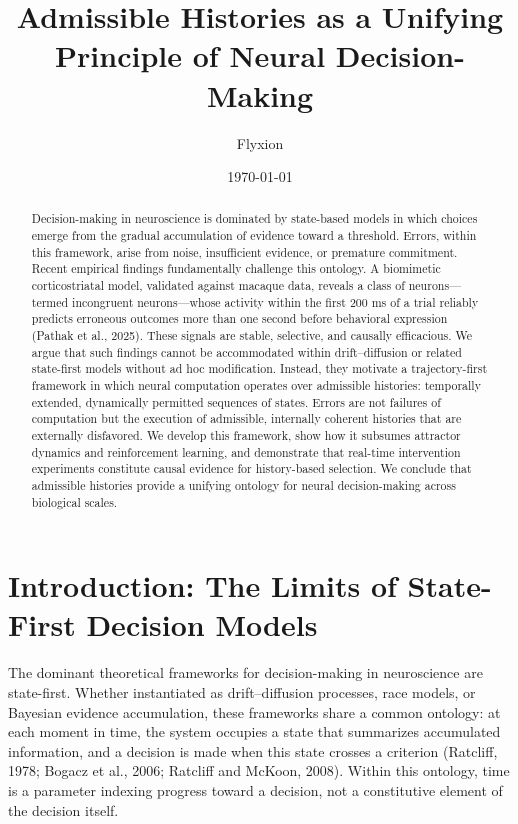\documentclass[11pt]{article}
\title{Admissible Histories as a Unifying Principle of Neural Decision-Making}
\author{Flyxion}
\date{\today}
\begin{document}
\maketitle

\begin{abstract}
Decision-making in neuroscience is dominated by state-based models in which choices emerge from the gradual accumulation of evidence toward a threshold. Errors, within this framework, arise from noise, insufficient evidence, or premature commitment. Recent empirical findings fundamentally challenge this ontology. A biomimetic corticostriatal model, validated against macaque data, reveals a class of neurons—termed incongruent neurons—whose activity within the first 200 ms of a trial reliably predicts erroneous outcomes more than one second before behavioral expression (Pathak et al., 2025). These signals are stable, selective, and causally efficacious. We argue that such findings cannot be accommodated within drift–diffusion or related state-first models without ad hoc modification. Instead, they motivate a trajectory-first framework in which neural computation operates over admissible histories: temporally extended, dynamically permitted sequences of states. Errors are not failures of computation but the execution of admissible, internally coherent histories that are externally disfavored. We develop this framework, show how it subsumes attractor dynamics and reinforcement learning, and demonstrate that real-time intervention experiments constitute causal evidence for history-based selection. We conclude that admissible histories provide a unifying ontology for neural decision-making across biological scales.
\end{abstract}

\section{Introduction: The Limits of State-First Decision Models}

The dominant theoretical frameworks for decision-making in neuroscience are state-first. Whether instantiated as drift–diffusion processes, race models, or Bayesian evidence accumulation, these frameworks share a common ontology: at each moment in time, the system occupies a state that summarizes accumulated information, and a decision is made when this state crosses a criterion (Ratcliff, 1978; Bogacz et al., 2006; Ratcliff and McKoon, 2008). Within this ontology, time is a parameter indexing progress toward a decision, not a constitutive element of the decision itself.
\end{document}
